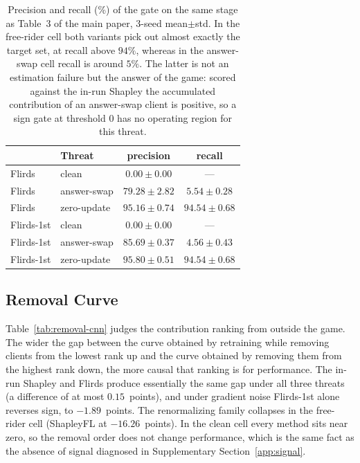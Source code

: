 \documentclass[letterpaper]{article} %
\theoremstyle{plain}
\begin{document}
\begin{table}[t]
\centering
\small
\caption{Precision and recall (\%) of the gate on the same stage as Table~3
of the main paper, 3-seed mean$\pm$std. In the free-rider cell both variants
pick out almost exactly the target set, at recall above $94\%$, whereas in
the answer-swap cell recall is around $5\%$. The latter is not an estimation
failure but the answer of the game: scored against the in-run Shapley the
accumulated contribution of an answer-swap client is positive, so a sign gate
at threshold $0$ has no operating region for this threat.}
\label{tab:gate-pr}
\begin{tabular}{llcc}
\hline
 & Threat & precision & recall \\
\hline
Flirds & clean & $0.00\pm0.00$ & --- \\
Flirds & answer-swap & $79.28\pm2.82$ & $5.54\pm0.28$ \\
Flirds & zero-update & $95.16\pm0.74$ & $94.54\pm0.68$ \\
Flirds-1st & clean & $0.00\pm0.00$ & --- \\
Flirds-1st & answer-swap & $85.69\pm0.37$ & $4.56\pm0.43$ \\
Flirds-1st & zero-update & $95.80\pm0.51$ & $94.54\pm0.68$ \\
\hline
\end{tabular}
\end{table}

\subsection{Removal Curve}
\label{app:removal}

Table~\ref{tab:removal-cnn} judges the contribution ranking from outside the
game. The wider the gap between the curve obtained by retraining while
removing clients from the lowest rank up and the curve obtained by removing
them from the highest rank down, the more causal that ranking is for
performance. The in-run Shapley and Flirds produce essentially the same gap
under all three threats (a difference of at most $0.15$~points), and under
gradient noise Flirds-1st alone reverses sign, to $-1.89$~points. The
renormalizing family collapses in the free-rider cell (ShapleyFL at
$-16.26$~points). In the clean cell every method sits near zero, so the
removal order does not change performance, which is the same fact as the
absence of signal diagnosed in Supplementary Section~\ref{app:signal}.
\end{document}
